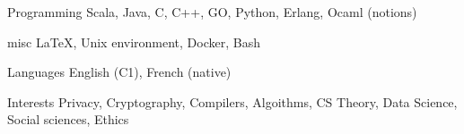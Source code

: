 


\begin{cvskills}


\cvskill
{Programming} %
{Scala, Java, C, C++, GO, Python, Erlang, Ocaml (notions)} %


\cvskill
{misc} %
{\LaTeX, Unix environment, Docker, Bash} %


\cvskill
{Languages} %
{English (C1), French (native)} %


\cvskill
{Interests} %
{Privacy, Cryptography, Compilers, Algoithms, CS Theory, Data Science, Social sciences, Ethics} %


\end{cvskills}